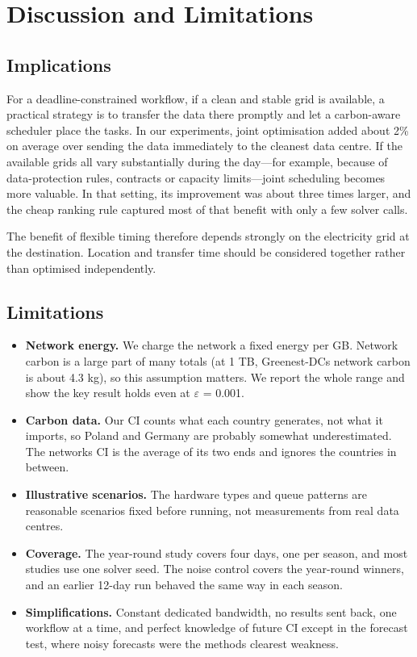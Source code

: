 \documentclass[12pt,a4paper,oneside,openany]{report}
\begin{document}
\chapter{Discussion and Limitations}\label{ch:7}

\section{Implications}\label{sec:7.1}

For a deadline-constrained workflow, if a clean and stable grid is
available, a practical strategy is to transfer the data there promptly
and let a carbon-aware scheduler place the tasks. In our experiments,
joint optimisation added about 2\% on average over sending the data
immediately to the cleanest data centre. If the available grids all vary
substantially during the day---for example, because of data-protection
rules, contracts or capacity limits---joint scheduling becomes more
valuable. In that setting, its improvement was about three times larger,
and the cheap ranking rule captured most of that benefit with only a few
solver calls.

The benefit of flexible timing therefore depends strongly on the
electricity grid at the destination. Location and transfer time should
be considered together rather than optimised independently.

\section{Limitations}\label{sec:7.2}

\begin{itemize}
\item
  \textbf{Network energy.} We charge the network a fixed energy per GB.
  Network carbon is a large part of many totals (at 1 TB,
  Greenest-DC\textquotesingle s network carbon is about 4.3 kg), so this
  assumption matters. We report the whole range and show the key result
  holds even at \ensuremath{\varepsilon} = 0.001.
\item
  \textbf{Carbon data.} Our CI counts what each country generates, not
  what it imports, so Poland and Germany are probably somewhat
  underestimated. The network\textquotesingle s CI is the average of its
  two ends and ignores the countries in between.
\item
  \textbf{Illustrative scenarios.} The hardware types and queue patterns
  are reasonable scenarios fixed before running, not measurements from
  real data centres.
\item
  \textbf{Coverage.} The year-round study covers four days, one per
  season, and most studies use one solver seed. The noise control covers
  the year-round winners, and an earlier 12-day run behaved the same way
  in each season.
\item
  \textbf{Simplifications.} Constant dedicated bandwidth, no results
  sent back, one workflow at a time, and perfect knowledge of future CI
  except in the forecast test, where noisy forecasts were the
  method\textquotesingle s clearest weakness.
\end{itemize}
\end{document}
